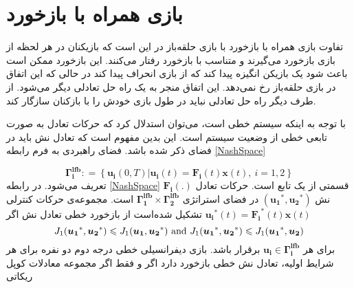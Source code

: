 \section{بازی همراه با بازخورد}
تفاوت بازی همراه با بازخورد با بازی حلقه‌باز در این است که بازیکنان در هر لحظه از بازی بازخورد می‌گیرند و متناسب با بازخورد رفتار می‌کنند. این بازخورد ممکن است باعث شود یک بازیکن انگیزه پیدا کند که از بازی انحراف پیدا کند در حالی که این اتفاق در بازی حلقه‌باز رخ نمی‌دهد. این اتفاق منجر به یک راه حل تعادلی دیگر می‌شود. از طرف دیگر راه حل تعادلی نباید در طول بازی خودش را با بازکنان سازگار کند.


با توجه به اینکه سیستم خطی است، می‌توان استدلال کرد که حرکات تعادل به صورت تابعی خطی از وضعیت سیستم است. این بدین مفهوم است که تعادل نش باید در فضای ذکر شده باشد. فضای راهبردی
 به فرم رابطه
 \ref{NashSpace}

\begin{equation}\label{NashSpace}
	\boldsymbol{\Gamma^{lfb}_i} :‌= \left\{\boldsymbol{u_i}(0, T)\vert \boldsymbol{u_i}(t) = \boldsymbol{F_i}(t)\boldsymbol{x}(t) ,~ i = 1, 2\right\}
\end{equation}
تعریف می‌شود. در رابطه
 \ref{NashSpace}
$\boldsymbol{F_i}(.)$
قسمتی از یک تابع است. حرکات تعادل نش
$(\boldsymbol{u_1}^*, \boldsymbol{u_2}^*)$
در فضای استراتژی 
$\boldsymbol{\Gamma^{lfb}_1}\times\boldsymbol{\Gamma^{lfb}_2}$
است.
مجموعه‌ی حرکات کنترلی 
$\boldsymbol{u_i}^*(t)=\boldsymbol{F_i}^*(t)\boldsymbol{x}(t)$
تشکیل شده‌است از بازخورد خطی تعادل نش اگر
\begin{equation*}
	J_1(\boldsymbol{u_1}^*, \boldsymbol{u_2}^*)\leq J_1(\boldsymbol{u_1}, \boldsymbol{u_2}^*)\text{\rm{ and }}
	J_1(\boldsymbol{u_1}^*,\boldsymbol{ u_2}^*)\leq J_1(\boldsymbol{u_1}^*, \boldsymbol{u_2})
\end{equation*}
برای هر 
$\boldsymbol{u_i}\in \boldsymbol{\Gamma^{lfb}_i}$
برقرار باشد.
بازی دیفرانسیلی خطی درجه دوم دو نفره برای هر شرایط اولیه، تعادل نش خطی بازخورد دارد اگر و فقط اگر مجموعه معادلات کوپل ریکاتی

